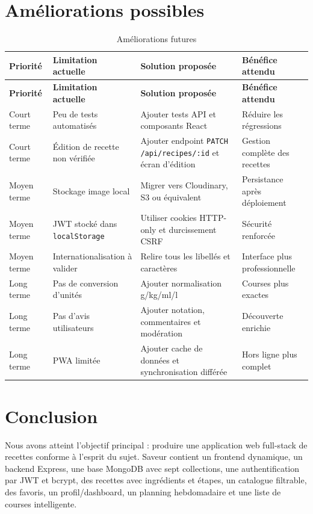 \documentclass[12pt,a4paper]{report}
\begin{document}
\chapter{Améliorations possibles}
\begin{longtable}{p{2.2cm}p{3.8cm}p{4.6cm}p{3.8cm}}
\caption{Améliorations futures}\label{tab:improvements}\\
\toprule
\textbf{Priorité} & \textbf{Limitation actuelle} & \textbf{Solution proposée} & \textbf{Bénéfice attendu} \\
\midrule
\endfirsthead
\toprule
\textbf{Priorité} & \textbf{Limitation actuelle} & \textbf{Solution proposée} & \textbf{Bénéfice attendu} \\
\midrule
\endhead
Court terme & Peu de tests automatisés & Ajouter tests API et composants React & Réduire les régressions \\
Court terme & Édition de recette non vérifiée & Ajouter endpoint \texttt{PATCH /api/recipes/:id} et écran d'édition & Gestion complète des recettes \\
Moyen terme & Stockage image local & Migrer vers Cloudinary, S3 ou équivalent & Persistance après déploiement \\
Moyen terme & JWT stocké dans \texttt{localStorage} & Utiliser cookies HTTP-only et durcissement CSRF & Sécurité renforcée \\
Moyen terme & Internationalisation à valider & Relire tous les libellés et caractères & Interface plus professionnelle \\
Long terme & Pas de conversion d'unités & Ajouter normalisation g/kg/ml/l & Courses plus exactes \\
Long terme & Pas d'avis utilisateurs & Ajouter notation, commentaires et modération & Découverte enrichie \\
Long terme & PWA limitée & Ajouter cache de données et synchronisation différée & Hors ligne plus complet \\
\bottomrule
\end{longtable}

\chapter{Conclusion}
Nous avons atteint l'objectif principal : produire une application web full-stack de recettes conforme à l'esprit du sujet. Saveur contient un frontend dynamique, un backend Express, une base MongoDB avec sept collections, une authentification par JWT et bcrypt, des recettes avec ingrédients et étapes, un catalogue filtrable, des favoris, un profil/dashboard, un planning hebdomadaire et une liste de courses intelligente.
\end{document}
